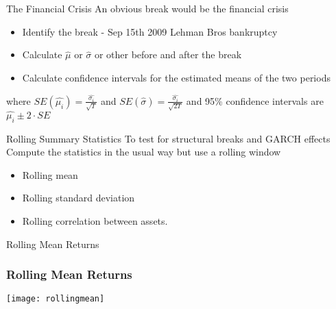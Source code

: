 \documentclass[14pt,xcolor=pdftex,dvipsnames,table]{beamer}
\begin{document}
\begin{frame}{The Financial Crisis}
An obvious break would be the financial crisis
\vspace{6pt}
\begin{itemize}
\item Identify the break - Sep 15th 2009 Lehman Bros bankruptcy
\item Calculate $\hat{\mu}$ or $\hat{\sigma}$ or other before and after the break
\item Calculate confidence intervals for the estimated means of the two periods
\end{itemize}
\vspace{6pt} where $SE(\hat{\mu_i}) = \frac{\hat{\sigma_i}}{\sqrt{T}}$ and $SE(\hat{\sigma}) = \frac{\hat{\sigma_i}}{\sqrt{2T}}$ and 95\% confidence intervals are 
$\hat{\mu_i} \pm 2 \cdot SE$
\end{frame}



\begin{frame}{Rolling Summary Statistics}
To test for structural breaks and GARCH effects
Compute the statistics in the usual way but use a rolling window 
\begin{itemize}
\item Rolling mean 
\item Rolling standard deviation
\item Rolling correlation between assets. 
\end{itemize}
\end{frame}

\begin{frame}{Rolling Mean Returns}
\frametitle{Rolling Mean Returns}
\begin{center}
\texttt{[image: rollingmean]}
\end{center}
\end{frame} 
\end{document}
